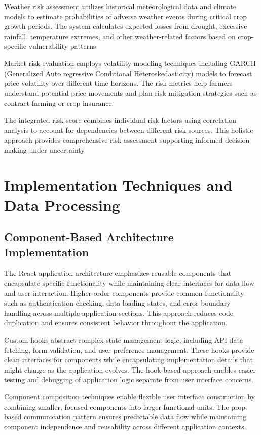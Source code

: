 Weather risk assessment utilizes historical meteorological data and climate models to estimate probabilities of adverse weather events during critical crop growth periods. The system calculates expected losses from drought, excessive rainfall, temperature extremes, and other weather-related factors based on crop-specific vulnerability patterns.

Market risk evaluation employs volatility modeling techniques including GARCH (Generalized Auto regressive Conditional Heteroskedasticity) models to forecast price volatility over different time horizons. The risk metrics help farmers understand potential price movements and plan risk mitigation strategies such as contract farming or crop insurance.

The integrated risk score combines individual risk factors using correlation analysis to account for dependencies between different risk sources. This holistic approach provides comprehensive risk assessment supporting informed decision-making under uncertainty.

\section{Implementation Techniques and Data Processing}

\subsection{Component-Based Architecture Implementation}

The React application architecture emphasizes reusable components that encapsulate specific functionality while maintaining clear interfaces for data flow and user interaction. Higher-order components provide common functionality such as authentication checking, data loading states, and error boundary handling across multiple application sections. This approach reduces code duplication and ensures consistent behavior throughout the application.

Custom hooks abstract complex state management logic, including API data fetching, form validation, and user preference management. These hooks provide clean interfaces for components while encapsulating implementation details that might change as the application evolves. The hook-based approach enables easier testing and debugging of application logic separate from user interface concerns.

Component composition techniques enable flexible user interface construction by combining smaller, focused components into larger functional units. The prop-based communication pattern ensures predictable data flow while maintaining component independence and reusability across different application contexts.

